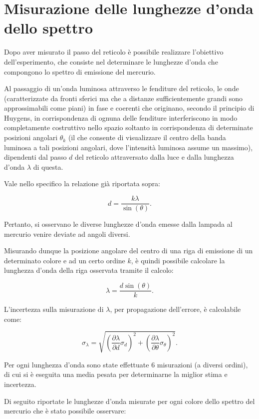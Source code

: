 \documentclass[a4paper,12pt]{article}
\begin{document}
\section{Misurazione delle lunghezze d’onda dello spettro}

Dopo aver misurato il passo del reticolo è possibile realizzare l’obiettivo dell’esperimento, che consiste nel determinare le lunghezze d’onda che compongono lo spettro di emissione del mercurio.

Al passaggio di un’onda luminosa attraverso le fenditure del reticolo, le onde (caratterizzate da fronti sferici ma che a distanze sufficientemente grandi sono approssimabili come piani) in fase e coerenti che originano, secondo il principio di Huygens, in corrispondenza di ognuna delle fenditure interferiscono in modo completamente costruttivo nello spazio soltanto in corrispondenza di determinate posizioni angolari \( \theta_k \) (il che consente di visualizzare il centro della banda luminosa a tali posizioni angolari, dove l’intensità luminosa assume un massimo), dipendenti dal passo \( d \) del reticolo attraversato dalla luce e dalla lunghezza d’onda \( \lambda \) di questa.

Vale nello specifico la relazione già riportata sopra:

\[
d = \frac{k\lambda}{\sin(\theta)}.
\]

Pertanto, si osservano le diverse lunghezze d’onda emesse dalla lampada al mercurio venire deviate ad angoli diversi.

Misurando dunque la posizione angolare del centro di una riga di emissione di un determinato colore e ad un certo ordine \( k \), è quindi possibile calcolare la lunghezza d’onda della riga osservata tramite il calcolo:

\[
\lambda = \frac{d \sin(\theta)}{k}.
\]

L’incertezza sulla misurazione di \( \lambda \), per propagazione dell’errore, è calcolabile come:

\[
\sigma_\lambda = \sqrt{\left(\frac{\partial \lambda}{\partial d} \sigma_d\right)^2 + \left(\frac{\partial \lambda}{\partial \theta} \sigma_\theta\right)^2}.
\]

Per ogni lunghezza d’onda sono state effettuate 6 misurazioni (a diversi ordini), di cui si è eseguita una media pesata per determinarne la miglior stima e incertezza.

Di seguito riportate le lunghezze d’onda misurate per ogni colore dello spettro del mercurio che è stato possibile osservare:
\end{document}
